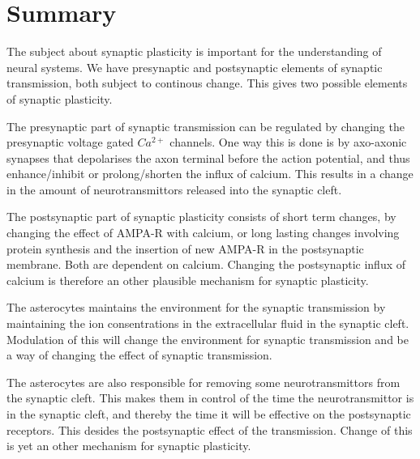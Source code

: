 \section{Summary}
The subject about synaptic plasticity is important for the understanding of neural systems.
We have presynaptic and postsynaptic elements of synaptic transmission, both subject to continous change. This gives two possible elements of synaptic plasticity. 

The presynaptic part of synaptic transmission can be regulated by changing the presynaptic voltage gated $Ca^{2+}$ channels. One way this is done is by axo-axonic synapses that depolarises the axon terminal before the action potential, and thus enhance/inhibit or prolong/shorten the influx of calcium. 
This results in a change in the amount of neurotransmittors released into the synaptic cleft.

The postsynaptic part of synaptic plasticity consists of short term changes, by changing the effect of AMPA-R with calcium, or long lasting changes involving protein synthesis and the insertion of new AMPA-R in the postsynaptic membrane. Both are dependent on calcium. Changing the postsynaptic influx of calcium is therefore an other plausible mechanism for synaptic plasticity.

The asterocytes maintains the environment for the synaptic transmission by maintaining the ion consentrations in the extracellular fluid in the synaptic cleft. 
Modulation of this will change the environment for synaptic transmission and be a way of changing the effect of synaptic transmission. 

The asterocytes are also responsible for removing some neurotransmittors from the synaptic cleft. 
This makes them in control of the time the neurotransmittor is in the synaptic cleft, and thereby the time it will be effective on the postsynaptic receptors.
This desides the postsynaptic effect of the transmission. Change of this is yet an other mechanism for synaptic plasticity.



